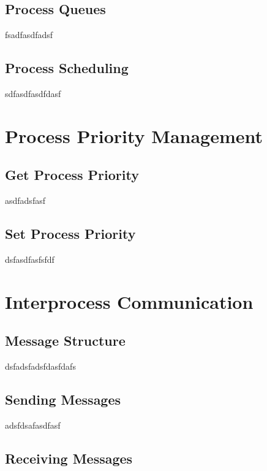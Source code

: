 \documentclass[12pt]{report}
\begin{document}
\subsection{Process Queues}

fsadfasdfadsf

\subsection{Process Scheduling}
sdfasdfasdfdasf


\section{Process Priority Management}

\subsection{Get Process Priority}

asdfadsfasf

\subsection{Set Process Priority}

dsfasdfasfsfdf


\section{Interprocess Communication}

\subsection{Message Structure}

dsfadsfadsfdasfdafs

\subsection{Sending Messages}

adsfdsafasdfasf

\subsection{Receiving Messages}
\end{document}

